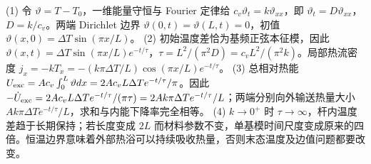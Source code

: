 (1) 令 \(\vartheta=T-T_0\)，一维能量守恒与 Fourier 定律给 \(c_v\vartheta_t=k\vartheta_{xx}\)，即 \(\vartheta_t=D\vartheta_{xx}\)，\(D=k/c_v\)。两端 Dirichlet 边界 \(\vartheta(0,t)=\vartheta(L,t)=0\)，初值 \(\vartheta(x,0)=\Delta T\sin(\pi x/L)\)。
(2) 初始温度差恰为基频正弦本征模，因此 \(\vartheta(x,t)=\Delta T\sin(\pi x/L)e^{-t/\tau}\)，\(\tau=L^2/(\pi^2D)=c_vL^2/(\pi^2k)\)。局部热流密度 \(j_x=-kT_x=-(k\pi\Delta T/L)\cos(\pi x/L)e^{-t/\tau}\)。
(3) 总相对热能 \(U_{\rm exc}=Ac_v\int_0^L\vartheta dx=2Ac_vL\Delta T e^{-t/\tau}/\pi\)。因此 \(-\dot U_{\rm exc}=2Ac_vL\Delta T e^{-t/\tau}/(\pi\tau)=2Ak\pi\Delta T e^{-t/\tau}/L\)；两端分别向外输送热量大小 \(Ak\pi\Delta T e^{-t/\tau}/L\)，求和与内能下降率完全相等。
(4) \(k\to0^+\) 时 \(\tau\to\infty\)，杆内温度差趋于长期保持；若长度变成 \(2L\) 而材料参数不变，单基模时间尺度变成原来的四倍。恒温边界意味着外部热浴可以持续吸收热量，否则末态温度及边值问题都要改变。
